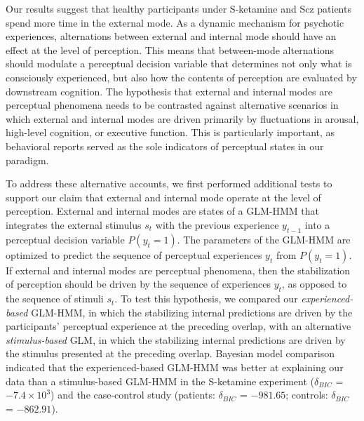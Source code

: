 \documentclass[
]{article}
\begin{document}
Our results suggest that healthy participants under S-ketamine and Scz
patients spend more time in the external mode. As a dynamic mechanism
for psychotic experiences, alternations between external and internal
mode should have an effect at the level of perception. This means that
between-mode alternations should modulate a perceptual decision variable
that determines not only what is consciously experienced, but also how
the contents of perception are evaluated by downstream cognition. The
hypothesis that external and internal modes are perceptual phenomena
needs to be contrasted against alternative scenarios in which external
and internal modes are driven primarily by fluctuations in arousal,
high-level cognition, or executive function. This is particularly
important, as behavioral reports served as the sole indicators of
perceptual states in our paradigm.

To address these alternative accounts, we first performed additional
tests to support our claim that external and internal mode operate at
the level of perception. External and internal modes are states of a
GLM-HMM that integrates the external stimulus \(s_t\) with the previous
experience \(y_{t-1}\) into a perceptual decision variable
\(P(y_t = 1)\). The parameters of the GLM-HMM are optimized to predict
the sequence of perceptual experiences \(y_t\) from \(P(y_t = 1)\). If
external and internal modes are perceptual phenomena, then the
stabilization of perception should be driven by the sequence of
experiences \(y_t\), as opposed to the sequence of stimuli \(s_t\). To
test this hypothesis, we compared our \emph{experienced-based} GLM-HMM,
in which the stabilizing internal predictions are driven by the
participants' perceptual experience at the preceding overlap, with an
alternative \emph{stimulus-based} GLM, in which the stabilizing internal
predictions are driven by the stimulus presented at the preceding
overlap. Bayesian model comparison indicated that the experienced-based
GLM-HMM was better at explaining our data than a stimulus-based GLM-HMM
in the S-ketamine experiment (\(\delta_{BIC}\) =
\(\ensuremath{-7.4\times 10^{3}}\)) and the case-control study
(patients: \(\delta_{BIC}\) = \(-981.65\); controls: \(\delta_{BIC}\) =
\(-862.91\)).
\end{document}
